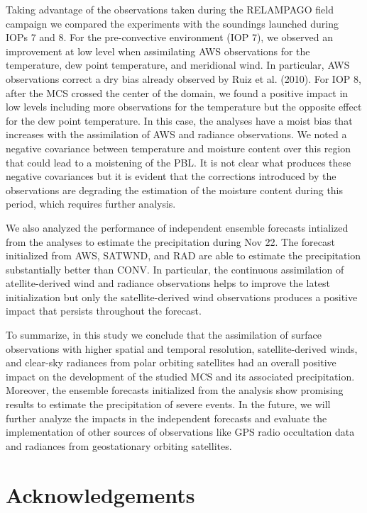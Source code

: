 \documentclass[final,5p,times,twocolumn,authoryear]{elsarticle} %
\begin{document}
Taking advantage of the observations taken during the RELAMPAGO field campaign we compared the experiments with the soundings launched during IOPs 7 and 8. For the pre-convective environment (IOP 7), we observed an improvement at low level when assimilating AWS observations for the temperature, dew point temperature, and meridional wind. In particular, AWS observations correct a dry bias already observed by Ruiz et al. (2010). For IOP 8, after the MCS crossed the center of the domain, we found a positive impact in low levels including more observations for the temperature but the opposite effect for the dew point temperature. In this case, the analyses have a moist bias that increases with the assimilation of AWS and radiance observations. We noted a negative covariance between temperature and moisture content over this region that could lead to a moistening of the PBL. It is not clear what produces these negative covariances but it is evident that the corrections introduced by the observations are degrading the estimation of the moisture content during this period, which requires further analysis.

We also analyzed the performance of independent ensemble forecasts intialized from the analyses to estimate the precipitation during Nov 22. The forecast initialized from AWS, SATWND, and RAD are able to estimate the precipitation substantially better than CONV. In particular, the continuous assimilation of atellite-derived wind and radiance observations helps to improve the latest initialization but only the satellite-derived wind observations produces a positive impact that persists throughout the forecast.

To summarize, in this study we conclude that the assimilation of surface observations with higher spatial and temporal resolution, satellite-derived winds, and clear-sky radiances from polar orbiting satellites had an overall positive impact on the development of the studied MCS and its associated precipitation. Moreover, the ensemble forecasts initialized from the analysis show promising results to estimate the precipitation of severe events. In the future, we will further analyze the impacts in the independent forecasts and evaluate the implementation of other sources of observations like GPS radio occultation data and radiances from geostationary orbiting satellites.

\hypertarget{acknowledgements}{%
\section{Acknowledgements}\label{acknowledgements}}
\end{document}
